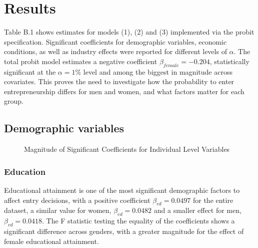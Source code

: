 \chapter{Results\label{ch:results}}

Table B.1 shows estimates for models (1), (2) and (3) implemented via the probit specification. Significant coefficients for demographic variables, economic conditions, as well as industry effects were reported for different levels of $\alpha$. The total probit model estimates a negative coefficient $\beta_{female} = -0.204$, statistically significant at the $\alpha = 1\%$ level and among the biggest in magnitude across covariates. This proves the need to investigate how the probability to enter entrepreneurship differs for men and women, and what factors matter for each group.

\section{Demographic variables}

\begin{figure}[hbtp]
    \caption{Magnitude of Significant Coefficients for Individual Level Variables} 
\end{figure}

\subsection{Education}

Educational attainment is one of the most significant demographic factors to affect entry decisions, with a positive coefficient $\beta_{ed} = 0.0497$ for the entire dataset, a similar value for women, $\beta_{ed} = 0.0482$ and a smaller effect for men, $\beta_{ed} = 0.0418$. The F statistic testing the equality of the coefficients shows a significant difference across genders, with a greater magnitude for the effect of female educational attainment. 

